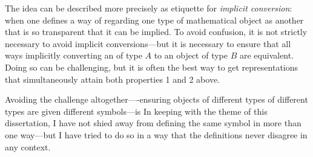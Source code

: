 The idea can be described more precisely as etiquette for \emph{implicit conversion}: when one defines a way of regarding one type of mathematical object as another that is so transparent that it can be implied. 
%
To avoid confusion, it is not strictly necessary to avoid implicit conversions---but it is necessary to ensure that all ways implicitly converting an of type $A$ to an object of type $B$ are equivalent. 
%
Doing so can be challenging, but it is often the best way to get representations that simultaneously attain both properties 1 and 2 above. 
%

Avoiding the challenge altogether----ensuring objects of different types of different types are given different symbols---is 
%
%
In keeping with the theme of this dissertation, I have not shied away from defining the same symbol in more than one way---but I have tried to do so in a way that the definitions never disagree in any context. 
%

    

